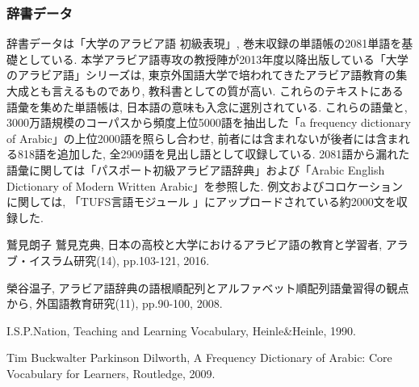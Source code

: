 \documentclass[technicalreport]{ieicej}
\begin{document}
\subsubsection{辞書データ}
辞書データは「大学のアラビア語 初級表現」, 巻末収録の単語帳の2081単語を基礎としている. 本学アラビア語専攻の教授陣が2013年度以降出版している「大学のアラビア語」シリーズは, 東京外国語大学で培われてきたアラビア語教育の集大成とも言えるものであり, 教科書としての質が高い. これらのテキストにある語彙を集めた単語帳は, 日本語の意味も入念に選別されている. これらの語彙と, 3000万語規模のコーパスから頻度上位5000語を抽出した「a frequency dictionary of Arabic」の上位2000語を照らし合わせ, 前者には含まれないが後者には含まれる818語を追加した, 全2909語を見出し語として収録している. 2081語から漏れた語彙に関しては「パスポート初級アラビア語辞典」および「Arabic English Dictionary of Modern Written Arabic」を参照した. 例文およびコロケーションに関しては, 「TUFS言語モジュール 」にアップロードされている約2000文を収録した.

\begin{thebibliography}{99}
鷲見朗子 鷲見克典, 日本の高校と大学におけるアラビア語の教育と学習者, アラブ・イスラム研究(14), pp.103-121, 2016.

榮谷温子, アラビア語辞典の語根順配列とアルファベット順配列語彙習得の観点から, 外国語教育研究(11), pp.90-100, 2008.

I.S.P.Nation, Teaching and Learning Vocabulary, Heinle\&Heinle, 1990. 

Tim Buckwalter  Parkinson Dilworth, A Frequency Dictionary of Arabic: Core Vocabulary for Learners, Routledge, 2009.

\end{thebibliography}
\end{document}
